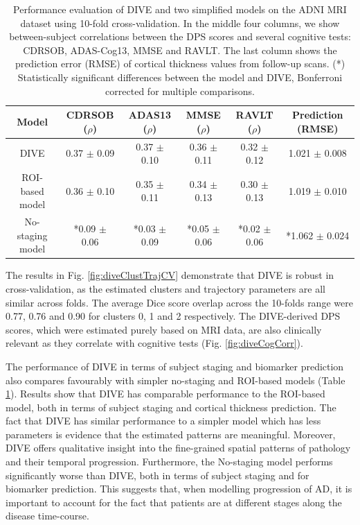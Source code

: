 \begin{table}[H]
\centering
\begin{footnotesize}
 \begin{tabular}{c | c c c c | c}
  Model & CDRSOB ($\rho$) & ADAS13 ($\rho$) & MMSE ($\rho$) & RAVLT ($\rho$) & Prediction (RMSE)\\
  \hline 
DIVE & 0.37 $\pm$ 0.09 & 0.37 $\pm$ 0.10 & 0.36 $\pm$ 0.11 & 0.32 $\pm$ 0.12 & 1.021 $\pm$ 0.008 \\
ROI-based model & 0.36 $\pm$ 0.10 & 0.35 $\pm$ 0.11 & 0.34 $\pm$ 0.13 & 0.30 $\pm$ 0.13 & 1.019 $\pm$ 0.010 \\
No-staging model & *0.09 $\pm$ 0.06 & *0.03 $\pm$ 0.09 & *0.05 $\pm$ 0.06 & *0.02 $\pm$ 0.06 & *1.062 $\pm$ 0.024 \\

 \end{tabular}
 \end{footnotesize}
 \caption[Performance evaluation of DIVE and two simplified models on the ADNI MRI dataset]{Performance evaluation of DIVE and two simplified models on the ADNI MRI dataset using 10-fold cross-validation. In the middle four columns, we show between-subject correlations between the DPS scores and several cognitive tests: CDRSOB, ADAS-Cog13, MMSE and RAVLT. The last column shows the prediction error (RMSE) of cortical thickness values from follow-up scans. (*) Statistically significant differences between the model and DIVE, Bonferroni corrected for multiple comparisons.}
 \label{tab:divePerfEval}
\end{table}

The results in Fig. \ref{fig:diveClustTrajCV} demonstrate that DIVE is robust in cross-validation, as the estimated clusters and trajectory parameters are all similar across folds. The average Dice score overlap across the 10-folds range were 0.77, 0.76 and 0.90 for clusters 0, 1 and 2 respectively. The DIVE-derived DPS scores, which were estimated purely based on MRI data, are also clinically relevant as they correlate with cognitive tests (Fig. \ref{fig:diveCogCorr}). 

The performance of DIVE in terms of subject staging and biomarker prediction also compares favourably with simpler no-staging and ROI-based models (Table \ref{tab:divePerfEval}). Results show that DIVE has comparable performance to the ROI-based model, both in terms of subject staging and cortical thickness prediction. The fact that DIVE has similar performance to a simpler model which has less parameters is evidence that the estimated patterns are meaningful. Moreover, DIVE offers qualitative insight into the fine-grained spatial patterns of pathology and their temporal progression. Furthermore, the No-staging model performs significantly worse than DIVE, both in terms of subject staging and for biomarker prediction. This suggests that, when modelling progression of AD, it is important to account for the fact that patients are at different stages along the disease time-course.



